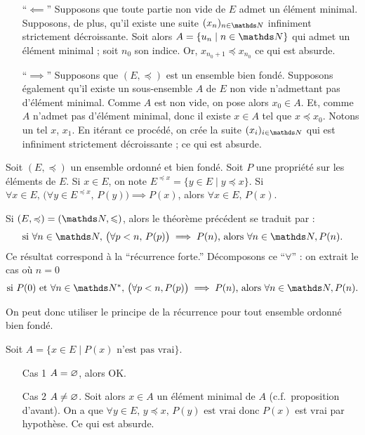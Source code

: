 \begin{prv}
	\begin{itemize}
		\item[``$\impliedby$'']
			Supposons que toute partie non vide de $E$\/ admet un élément minimal.
			Supposons, de plus, qu'il existe une suite $(x_n)_{n\in\N}$\/ infiniment strictement décroissante.
			Soit alors $A = \{u_n  \mid n \in \N\}$ qui admet un élément minimal ; soit $n_0$\/ son indice.
			Or, $x_{n_0+1}\preceq x_{n_0}$\/ ce qui est absurde.
		\item[``$\implies$'']
			Supposons que $(E, \preceq)$\/ est un ensemble bien fondé.
			Supposons également qu'il existe un sous-ensemble $A$\/ de $E$\/ non vide n'admettant pas d'élément minimal.
			Comme $A$\/ est non vide, on pose alors $x_0 \in A$.
			Et, comme $A$\/ n'admet pas d'élément minimal, donc il existe $x \in A$\/ tel que $x \preceq x_0$. Notons un tel $x$, $x_1$. En itérant ce procédé, on crée la suite $(x_i)_{i\in\N}$\/ qui est infiniment strictement décroissante ; ce qui est absurde.
	\end{itemize}
\end{prv}

\begin{thm}
	Soit $(E, \preceq)$\/ un ensemble ordonné et bien fondé. Soit $P$\/ une propriété sur les éléments de $E$.
	Si $x \in E$, on note $E^{\preceq x} = \{y \in E  \mid  y \preceq x\}$.
	Si $\forall x \in E,\,\big(\forall y \in E^{\preceq x},\,P(y)\big) \implies P(x)$, alors $\forall x \in E,\,P(x)$.
\end{thm}

\begin{rmk}
	Si $(E, \preceq) = (\N, \le)$, alors le théorème précédent se traduit par : \[
		\hbox{si $\forall n \in \N,\,\big(\forall p < n,\,P(p)\big)\implies P(n)$, alors $\forall n \in \N, P(n)$.}
	\]
	Ce résultat correspond à la ``récurrence forte.''
	Décomposons ce ``$\forall$\/'' : on extrait le cas où $n = 0$\/ \[
		\hbox{si $P(0)$\/ et $\forall n \in \N^*,\,\big(\forall p < n, P(p)\big) \implies P(n)$, alors $\forall n \in \N, P(n)$}
	.\] 
\end{rmk}

On peut donc utiliser le principe de la récurrence pour tout ensemble ordonné bien fondé.

\begin{prv}
	Soit $A = \{x \in E  \mid P(x) \text{ n'est pas vrai}\}$.

	\begin{itemize}
		\item[\sc Cas 1] $A = \varnothing$, alors OK.
		\item[\sc Cas 2] $A \neq \varnothing$. Soit alors $x \in A$\/ un élément minimal de $A$\/ (c.f.\ proposition d'avant). On a que $\forall y \in E,\,y \preceq x,\,P(y) \text{ est vrai}$ donc $P(x)$\/ est vrai par hypothèse. Ce qui est absurde.
	\end{itemize}
\end{prv}

